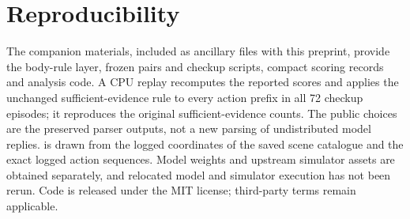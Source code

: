 \documentclass{article}
\begin{document}
\section{Reproducibility}
\label{app:repro}
The companion materials, included as ancillary files with this preprint, provide the body-rule layer, frozen pairs and checkup scripts, compact scoring records and analysis code. A CPU replay recomputes the reported scores and applies the unchanged sufficient-evidence rule to every action prefix in all 72 checkup episodes; it reproduces the original sufficient-evidence counts. The public choices are the preserved parser outputs, not a new parsing of undistributed model replies.  is drawn from the logged coordinates of the saved scene catalogue and the exact logged action sequences. Model weights and upstream simulator assets are obtained separately, and relocated model and simulator execution has not been rerun. Code is released under the MIT license; third-party terms remain applicable.
\end{document}
